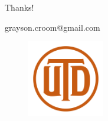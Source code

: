 \documentclass[11pt]{beamer}
\makeatletter
\newcommand{\email}{grayson.croom@gmail.com}
\makeatother
\begin{document}
\begin{frame}

\begin{center}
    Thanks!
    
    \email
\end{center}

\begin{figure}
    \centering
    \includegraphics[width=0.3\textwidth]{imagens/utd.png}
\end{figure}

\end{frame}
\end{document}

